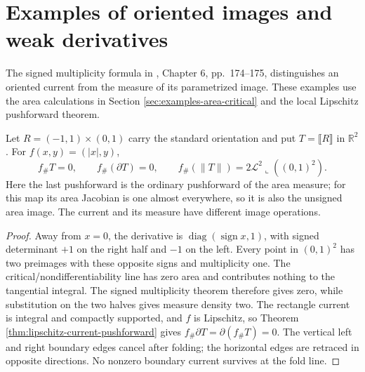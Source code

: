 \chapter{Examples of oriented images and weak derivatives}\label{sec:examples-current-images}
The signed multiplicity formula in \cite{Sim18}, Chapter 6, pp.~174--175, distinguishes an oriented current from the measure of its parametrized image. These examples use the area calculations in Section \ref{sec:examples-area-critical} and the local Lipschitz pushforward theorem.

\begin{example}\label{ex:current-folded-rectangle}
Let $R=(-1,1)\times(0,1)$ carry the standard orientation and put $T=\llbracket R\rrbracket$ in $\mathbb R^2$. For $f(x,y)=(|x|,y)$,
\[
 f_\#T=0,\qquad f_\#(\partial T)=0,
 \qquad f_\#(\|T\|)=2\mathcal L^2\llcorner((0,1)^2).
\]
Here the last pushforward is the ordinary pushforward of the area measure; for this map its area Jacobian is one almost everywhere, so it is also the unsigned area image. The current and its measure have different image operations.
\end{example}
\begin{proof}
Away from $x=0$, the derivative is $\operatorname{diag}(\operatorname{sign}x,1)$, with signed determinant $+1$ on the right half and $-1$ on the left. Every point in $(0,1)^2$ has two preimages with these opposite signs and multiplicity one. The critical/nondifferentiability line has zero area and contributes nothing to the tangential integral. The signed multiplicity theorem therefore gives zero, while substitution on the two halves gives measure density two. The rectangle current is integral and compactly supported, and $f$ is Lipschitz, so Theorem \ref{thm:lipschitz-current-pushforward} gives $f_\#\partial T=\partial(f_\#T)=0$. The vertical left and right boundary edges cancel after folding; the horizontal edges are retraced in opposite directions. No nonzero boundary current survives at the fold line.
\end{proof}

